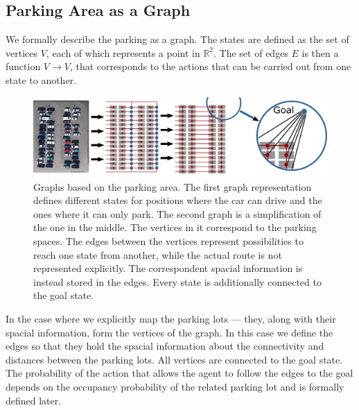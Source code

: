 \subsection{Parking Area as a Graph} %
\label{sub:parking_area_as_a_graph_}

We formally describe the parking as a graph. The states are defined as the set
of vertices $V$, each of which represents a point in $\mathbb{R}^2$. The set
of edges $E$ is then a function $V \rightarrow V$, that corresponds to the
actions that can be carried out from one state to another.

\begin{figure}[t]
    \begin{center}
        \includegraphics[width=\textwidth]{pictures/graph.pdf}
    \end{center}
    \caption{Graphs based on the parking area. The first graph representation defines different states for positions where the car can drive and the ones where it can only park.
    The second graph is a simplification of the one in the middle. The vertices in it correspond to the parking spaces. The edges between the vertices represent possibilities to reach one state from another, while the actual route is not represented explicitly. The correspondent spacial information is instead stored in the edges. Every state is additionally connected to the goal state.}
    \vspace{-5mm}
    \label{fig:graph}
\end{figure}

In the case where we explicitly map the parking lots --- they, along with
their spacial information, form the vertices of the graph. In this case we
define the edges so that they hold the spacial information about the
connectivity and distances between the parking lots. All vertices are
connected to the goal state. The probability of the action that allows the
agent to follow the edges to the goal depends on the occupancy probability of
the related parking lot and is formally defined later.


